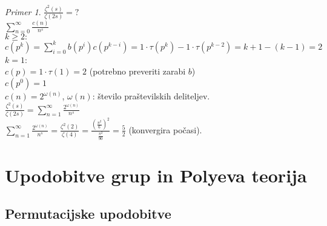 \documentclass[a4paper, 12pt]{book}
\theoremstyle{definition}
\theoremstyle{remark}
\newtheorem*{ex}{Primer}
\begin{document}
\begin{ex}
  $\frac{\zeta^2(s)}{\zeta(2s)} = ?$ \\
  $\sum_{n=0}^{\infty} \frac{c(n)}{n^s}$ \\
  $k \geq 2:$ \\
  $c(p^k) = \sum_{i=0}^{k} b(p^i) c(p^{k-i}) = 1 \cdot \tau(p^k) - 1 \cdot \tau(p^{k-2}) = k+1-(k-1) = 2$ \\
  $k = 1$: \\
  $c(p) = 1 \cdot \tau(1) = 2$ (potrebno preveriti zarabi $b$) \\
  $c(p^0) = 1$ \\
  $c(n) = 2^{\omega(n)}$, $\omega(n)$: število praštevilskih deliteljev. \\
  $\frac{\zeta^2(s)}{\zeta(2s)} = \sum_{n=1}^{\infty} \frac{2^{\omega(n)}}{n^s}$ \\
  $\sum_{n=1}^{\infty} \frac{2^{\omega(n)}}{n^s} = \frac{\zeta^2(2)}{\zeta(4)}
  = \frac{\left(\frac{\pi^2}{6}\right)^2}{\frac{\pi^2}{90}} = \frac{5}{2}$ (konvergira počasi).
\end{ex}



\chapter{Upodobitve grup in Polyeva teorija}


\section{Permutacijske upodobitve}
\end{document}

